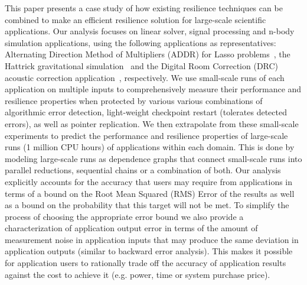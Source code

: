 \documentclass[10pt, conference, compsocconf]{IEEEtran}
\begin{document}
This paper presents a case study of how existing resilience techniques can be combined to make an efficient resilience solution for large-scale scientific applications.
Our analysis focuses on linear solver, signal processing and n-body simulation applications, using the following applications as representatives: Alternating Direction Method of Multipliers (ADDR) for Lasso problems~\cite{lasso:2011}, the Hattrick gravitational simulation~\cite{hattrick:2012} and the Digital Room Correction (DRC) acoustic correction application~\cite{drc:2012}, respectively.
We use small-scale runs of each application on multiple inputs to comprehensively measure their performance and resilience properties when protected by various various combinations of algorithmic error detection, light-weight checkpoint restart (tolerates detected errors), as well as pointer replication.
We then extrapolate from these small-scale experiments to predict the performance and resilience properties of large-scale runs (1 million CPU hours) of applications within each domain.
This is done by modeling large-scale runs as dependence graphs that connect small-scale runs into parallel reductions, sequential chains or a combination of both.
Our analysis explicitly accounts for the accuracy that users may require from applications in terms of a bound on the Root Mean Squared (RMS) Error of the results as well as a bound on the probability that this target will not be met.
To simplify the process of choosing the appropriate error bound we also provide a characterization of application output error in terms of the amount of measurement noise in application inputs that may produce the same deviation in application outputs (similar to backward error analysis).
This makes it possible for application users to rationally trade off the accuracy of application results against the cost to achieve it (e.g. power, time or system purchase price).
\end{document}
